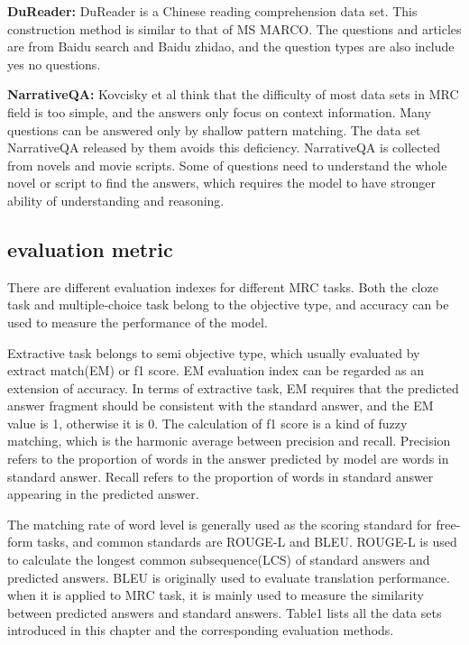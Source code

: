 \noindent\textbf{DuReader: }DuReader is a Chinese reading comprehension data set. This construction method is similar to 
that of MS MARCO. The questions and articles are from Baidu search and Baidu zhidao, and the question types are also include yes no questions. 

\noindent\textbf{NarrativeQA: }Kovcisky et al think that the difficulty of most data sets in MRC field is too simple, and the answers only 
focus on context information. Many questions can be answered only by shallow pattern matching. The data set NarrativeQA released by them avoids this 
deficiency. NarrativeQA is collected from novels and movie scripts. Some of questions need to understand the whole novel or script to find the answers, 
which requires the model to have stronger ability of understanding and reasoning.

\subsection{evaluation metric}
There are different evaluation indexes for different MRC tasks. Both the cloze task and multiple-choice task belong to the objective 
type, and accuracy can be used to measure the performance of the model. 

Extractive task belongs to semi objective type, which usually 
evaluated by extract match(EM) or f1 score. EM evaluation index can be regarded as an extension of accuracy. In terms of extractive task, 
EM requires that the predicted answer fragment should be consistent with the standard answer, and the EM value is 1, otherwise it is 0. 
The calculation of f1 score is a kind of fuzzy matching, which is the harmonic average between precision and recall. 
Precision refers to the proportion of words in the answer predicted by model are words in standard answer. 
Recall refers to the proportion of words in standard answer appearing in the predicted answer.

The matching rate of word level is generally used as the scoring standard for free-form tasks, and common standards are ROUGE-L and BLEU. 
ROUGE-L is used to calculate the longest common subsequence(LCS) of standard answers and predicted answers. BLEU is originally used 
to evaluate translation performance. when it is applied to MRC task, it is mainly used to measure the similarity between predicted 
answers and standard answers. Table1 lists all the data sets introduced in this chapter and the corresponding evaluation methods.